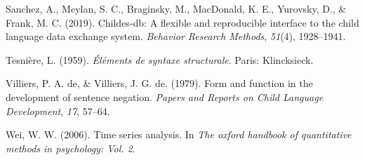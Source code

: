 \documentclass[
  english,
  man,floatsintext]{apa6}
\begin{document}
\leavevmode\hypertarget{ref-sanchez2019childes}{}%
Sanchez, A., Meylan, S. C., Braginsky, M., MacDonald, K. E., Yurovsky, D., \& Frank, M. C. (2019). Childes-db: A flexible and reproducible interface to the child language data exchange system. \emph{Behavior Research Methods}, \emph{51}(4), 1928--1941.

\leavevmode\hypertarget{ref-dg}{}%
Tesnière, L. (1959). \emph{Éléments de syntaxe structurale}. Paris: Klincksieck.

\leavevmode\hypertarget{ref-de1979form}{}%
Villiers, P. A. de, \& Villiers, J. G. de. (1979). Form and function in the development of sentence negation. \emph{Papers and Reports on Child Language Development}, \emph{17}, 57--64.

\leavevmode\hypertarget{ref-wei2006time}{}%
Wei, W. W. (2006). Time series analysis. In \emph{The oxford handbook of quantitative methods in psychology: Vol. 2}.
\end{document}

